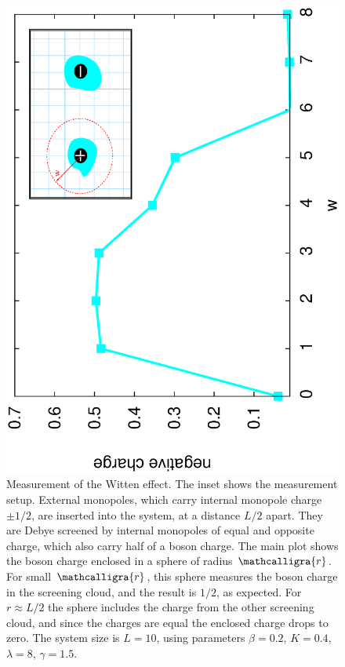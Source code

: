\documentclass[prb,twocolumn]{revtex4-1}
\newcommand{\scripty}[1]{\ensuremath{\mathcalligra{#1}}}
\begin{document}
\begin{figure}
\includegraphics[angle=-90,width=0.9\linewidth]{figures/wittenout.eps}
\caption{Measurement of the Witten effect. The inset shows the measurement setup. External monopoles, which carry internal monopole charge $\pm 1/2$, are inserted into the system, at a distance $L/2$ apart. They are Debye screened by internal monopoles of equal and opposite charge, which also carry half of a boson charge. The main plot shows the boson charge enclosed in a sphere of radius $\scripty{r}$. For small $\scripty{r}$, this sphere measures the boson charge in the screening cloud, and the result is $1/2$, as expected. For $r\approx L/2$ the sphere includes the charge from the other screening cloud, and since the charges are equal the enclosed charge drops to zero. The system size is $L=10$, using parameters $\beta=0.2$, $K=0.4$, $\lambda=8$, $\gamma=1.5$.}
\label{witten}
\end{figure}
\end{document}
